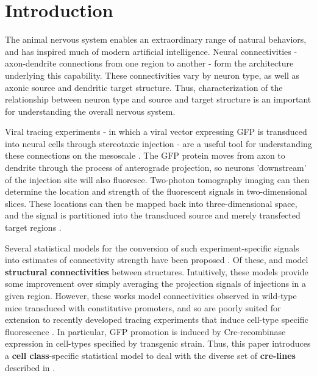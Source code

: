 \section{Introduction}
 
The animal nervous system enables an extraordinary range of natural behaviors, and has inspired much of modern artificial intelligence.
Neural connectivities - axon-dendrite connections from one region to another - form the architecture underlying this capability.
These connectivities vary by neuron type, as well as axonic source and dendritic target structure.
Thus, characterization of the relationship between neuron type and source and target structure is an important for understanding the overall nervous system.

Viral tracing experiments - in which a viral vector expressing GFP is transduced into neural cells through stereotaxic injection - are a useful tool for understanding these connections on the mesoscale \citep{Chamberlin1998-hi,Harris2012-fw, Daigle2018-gd}.
The GFP protein moves from axon to dendrite through the process of anterograde projection, so neurons 'downstream' of the injection site will also fluoresce.
Two-photon tomography imaging can then determine the location and strength of the fluorescent signals in two-dimensional slices.
These locations can then be mapped back into three-dimensional space, and the signal is partitioned into the transduced source and merely transfected target regions .

Several statistical models for the conversion of such experiment-specific signals into estimates of connectivity strength have been proposed \citep{Oh2014-kh, Harris2016-fn, Knox2019-ot}.
Of these, \citet{Oh2014-kh} and \citet{Knox2019-ot} model \textbf{structural connectivities} between structures.
Intuitively, these models provide some improvement over simply averaging the projection signals of injections in a given region.
However, these works model connectivities observed in wild-type mice transduced with constitutive promoters, and so are poorly suited for extension to recently developed tracing experiments that induce cell-type specific fluorescence \citep{Harris2019-mr}.
In particular, GFP promotion is induced by Cre-recombinase expression in cell-types specified by transgenic strain.
Thus, this paper introduces a \textbf{cell class}-specific statistical model to deal with the diverse set of \textbf{cre-lines} described in \citet{Harris2019-mr}.

